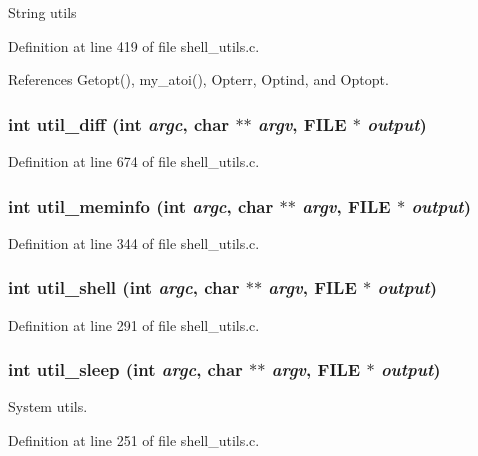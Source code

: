 String utils 

Definition at line 419 of file shell\_\-utils.c.

References Getopt(), my\_\-atoi(), Opterr, Optind, and Optopt.
\subsubsection{\setlength{\rightskip}{0pt plus 5cm}int util\_\-diff (int {\em argc}, char $\ast$$\ast$ {\em argv}, FILE $\ast$ {\em output})}\label{shell__utils_8h_a6}




Definition at line 674 of file shell\_\-utils.c.
\subsubsection{\setlength{\rightskip}{0pt plus 5cm}int util\_\-meminfo (int {\em argc}, char $\ast$$\ast$ {\em argv}, FILE $\ast$ {\em output})}\label{shell__utils_8h_a4}




Definition at line 344 of file shell\_\-utils.c.
\subsubsection{\setlength{\rightskip}{0pt plus 5cm}int util\_\-shell (int {\em argc}, char $\ast$$\ast$ {\em argv}, FILE $\ast$ {\em output})}\label{shell__utils_8h_a3}




Definition at line 291 of file shell\_\-utils.c.
\subsubsection{\setlength{\rightskip}{0pt plus 5cm}int util\_\-sleep (int {\em argc}, char $\ast$$\ast$ {\em argv}, FILE $\ast$ {\em output})}\label{shell__utils_8h_a2}


System utils. 

Definition at line 251 of file shell\_\-utils.c.

